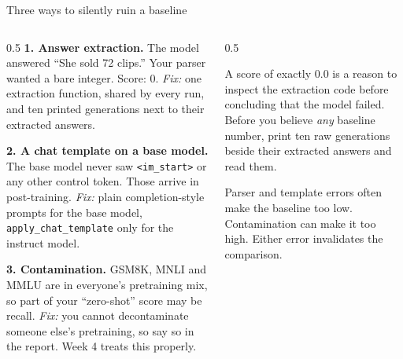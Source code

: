 \documentclass[aspectratio=169,10pt]{beamer}
\begin{document}
\begin{frame}[shrink=8]{Three ways to silently ruin a baseline}
  \begin{columns}[T]
    \begin{column}{0.5\textwidth}
      \small
      \textbf{1. Answer extraction.}
      The model answered ``She sold 72 clips.'' Your parser wanted a bare
      integer. Score: 0.
      \textit{Fix:} one extraction function, shared by every run, and ten
      printed generations next to their extracted answers.
      \vspace{0.5em}

      \textbf{2. A chat template on a base model.}
      The base model never saw \texttt{<\textbar im\_start\textbar>} or any
      other control token. Those arrive in post-training.
      \textit{Fix:} plain completion-style prompts for the base model,
      \texttt{apply\_chat\_template} only for the instruct model.
      \vspace{0.5em}

      \textbf{3. Contamination.}
      GSM8K, MNLI and MMLU are in everyone's pretraining mix, so part of your
      ``zero-shot'' score may be recall.
      \textit{Fix:} you cannot decontaminate someone else's pretraining, so
      say so in the report. Week 4 treats this properly.
    \end{column}
    \begin{column}{0.5\textwidth}
      \begin{gotcha}
        A score of exactly 0.0 is a reason to inspect the extraction code
        before concluding that the model failed.
        \vspace{0.4em}
        Before you believe \emph{any} baseline number, print ten raw
        generations beside their extracted answers and read them.
      \end{gotcha}
      \vspace{0.6em}
      \small
      Parser and template errors often make the baseline too low.
      Contamination can make it too high. Either error invalidates the
      comparison.
    \end{column}
  \end{columns}
\end{frame}
\end{document}
